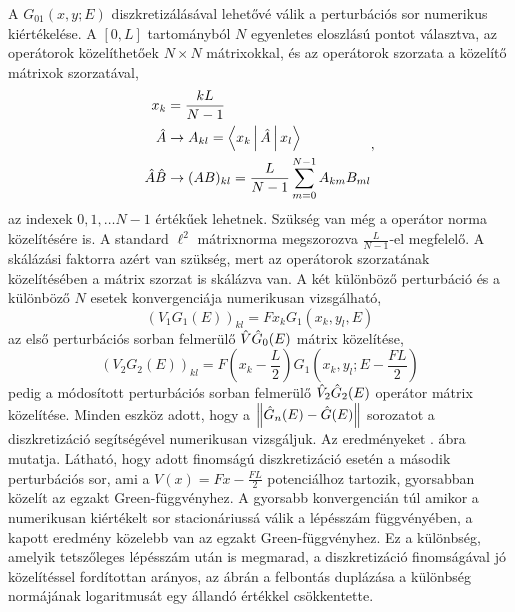 A $G_01(x,y;E)$ diszkretizálásával lehetővé válik a perturbációs sor numerikus kiértékelése. A $[0,L]$ tartományból $N$ egyenletes eloszlású pontot választva, az operátorok közelíthetőek $N\times N$ mátrixokkal, és az operátorok szorzata a közelítő mátrixok szorzatával,
\begin{equation}
	\begin{aligned}
		x_k&=\frac{kL}{N-1}\\
		\hat{A}&\rightarrow A_{kl}=\Braket{x_k|\hat{A}|x_l}\\
		\hat{A}\hat{B}&\rightarrow (AB)_{kl}=\frac{L}{N-1}\sum_{m=0}^{N-1}A_{km}B_{ml}
	\end{aligned},
\end{equation}
az indexek $0,1,\dots N-1$ értékűek lehetnek. Szükség van még a operátor norma közelítésére is. A standard $\ell^2$ mátrixnorma megszorozva $\frac{L}{N-1}$-el megfelelő. A skálázási faktorra azért van szükség, mert az operátorok szorzatának közelítésében a mátrix szorzat is skálázva van. A két különböző perturbáció és a különböző $N$ esetek konvergenciája numerikusan vizsgálható,
\begin{equation}
	(V_1G_1(E))_{kl}=Fx_kG_1(x_k,y_l,E)
\end{equation}
az első perturbációs sorban felmerülő $\hat{V}\hat{G}_0(E)$ mátrix közelítése,
\begin{equation}
	\left(V_2G_2(E)\right)_{kl}=F\left(x_k-\frac{L}{2}\right)G_1\left(x_k,y_l;E-\frac{FL}{2}\right)
\end{equation}
pedig a módosított perturbációs sorban felmerülő $\hat{V}_2\hat{G}_2(E)$ operátor mátrix közelítése. Minden eszköz adott, hogy a $\left\lVert \hat{G}_n(E)-\hat{G}(E) \right\rVert$ sorozatot a diszkretizáció segítségével numerikusan vizsgáljuk. Az eredményeket . ábra mutatja. Látható, hogy adott finomságú diszkretizáció esetén a második perturbációs sor, ami a $V(x)=Fx-\frac{FL}{2}$ potenciálhoz tartozik, gyorsabban közelít az egzakt Green-függvényhez. A gyorsabb konvergencián túl amikor a numerikusan kiértékelt sor stacionáriussá válik a lépésszám függvényében, a kapott eredmény közelebb van az egzakt Green-függvényhez. Ez a különbség, amelyik tetszőleges lépésszám után is megmarad, a diszkretizáció finomságával jó közelítéssel fordítottan arányos, az ábrán a felbontás duplázása a különbség normájának logaritmusát egy állandó értékkel csökkentette.
